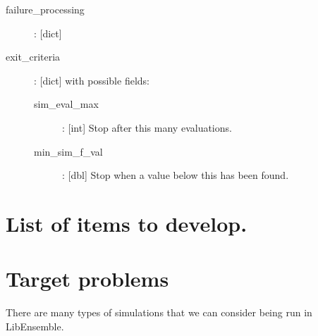 \documentclass{article}
\newenvironment{allintypewriter}{\ttfamily}{\par}
\begin{document}
\begin{allintypewriter}
\begin{description}
    \item[failure\_processing]: [dict]


    \item[exit\_criteria]: [dict] with possible fields:
      \begin{description}
        \item[sim\_eval\_max]: [int] Stop after this many evaluations.
        \item[min\_sim\_f\_val]: [dbl] Stop when a value below this has been found.
      \end{description}
  \end{description}
\end{allintypewriter}
        




\section{List of items to develop.}



\section{Target problems}
There are many types of simulations that we can consider being run in LibEnsemble.
\end{document}
